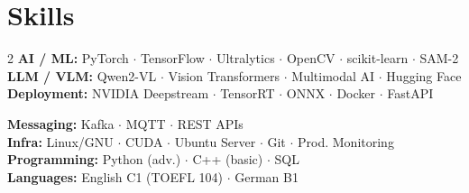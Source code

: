 \documentclass[10pt,a4paper]{article}
\begin{document}
\section{Skills}
\begin{multicols}{2}
\small\noindent
{\color{accent}\bfseries AI / ML:} PyTorch $\cdot$ TensorFlow $\cdot$ Ultralytics $\cdot$ OpenCV $\cdot$ scikit-learn $\cdot$ SAM-2\\[1pt]
{\color{accent}\bfseries LLM / VLM:} Qwen2-VL $\cdot$ Vision Transformers $\cdot$ Multimodal AI $\cdot$ Hugging Face\\[1pt]
{\color{accent}\bfseries Deployment:} NVIDIA Deepstream $\cdot$ TensorRT $\cdot$ ONNX $\cdot$ Docker $\cdot$ FastAPI

\columnbreak
{\color{accent}\bfseries Messaging:} Kafka $\cdot$ MQTT $\cdot$ REST APIs\\[1pt]
{\color{accent}\bfseries Infra:} Linux/GNU $\cdot$ CUDA $\cdot$ Ubuntu Server $\cdot$ Git $\cdot$ Prod. Monitoring\\[1pt]
{\color{accent}\bfseries Programming:} Python (adv.) $\cdot$ C++ (basic) $\cdot$ SQL\\[1pt]
{\color{accent}\bfseries Languages:} English C1 (TOEFL 104) $\cdot$ German B1
\end{multicols}
\end{document}
